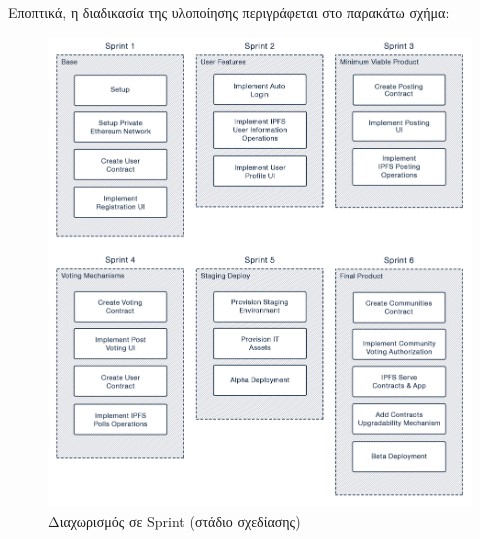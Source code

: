 \newpage
Εποπτικά, η διαδικασία της υλοποίησης περιγράφεται στο παρακάτω σχήμα:

\begin{figure}[H]
    \centering
    \includegraphics[width=\textwidth]{assets/figures/chapter-3/3.8.implementation-methodology-specification-sprints.png}
    \caption{Διαχωρισμός σε Sprint (στάδιο σχεδίασης)}
    \label{figure:3.8.implementation-methodology-specification-sprints}
\end{figure}
